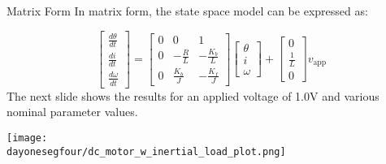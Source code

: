 	\begin{frame}{Matrix Form}
		In matrix form, the state space model can be expressed as:
		
		\[
		\left[\begin{array}{c}
		\frac{d\theta}{dt} \\
		\frac{di}{dt} \\
		\frac{d\omega}{dt}
		\end{array}\right]
		=
		\left[\begin{array}{ccc}
		0 & 0 & 1 \\
		0 & -\frac{R}{L} & -\frac{K_b}{L} \\
		0 & \frac{K_b}{J} & -\frac{K_f}{J}
		\end{array}\right]
		\left[\begin{array}{c}
		\theta \\
		i \\
		\omega
		\end{array}\right]
		+
		\left[\begin{array}{c}
		0 \\
		\frac{1}{L} \\
		0
		\end{array}\right]
		v_{\text{app}}
		\]
	The next slide shows the results for an applied voltage of 1.0V and various nominal parameter values.	
	\end{frame}
	

\begin{frame}
	\begin{center}
		\texttt{[image: \\dayonesegfour/dc\_motor\_w\_inertial\_load\_plot.png]}
	\end{center}
\end{frame}

